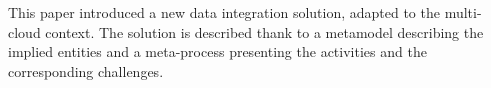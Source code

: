 This paper introduced a new data integration solution, adapted to the multi-cloud context. The solution is described thank to a metamodel describing the implied entities and a meta-process presenting the activities and the corresponding challenges. 



